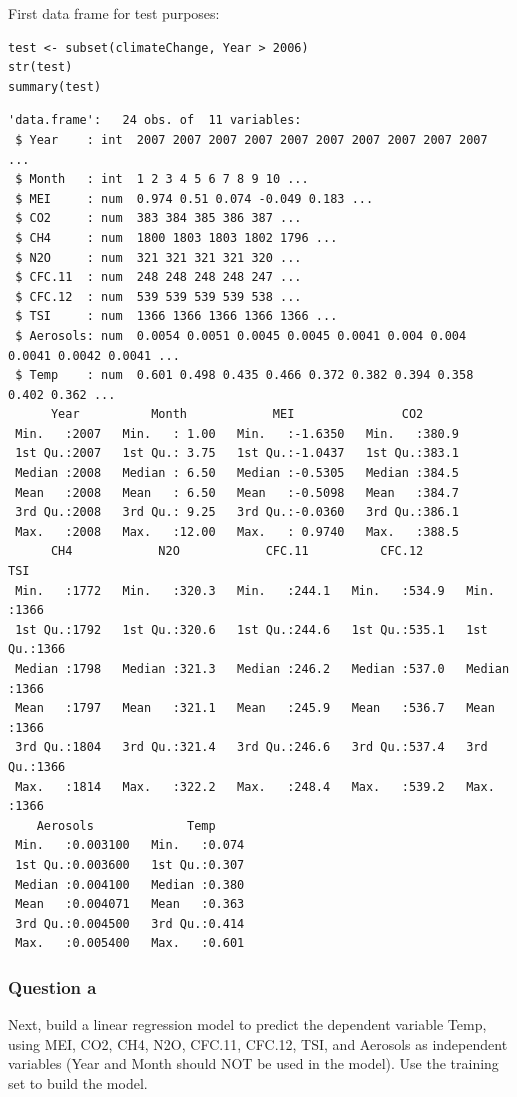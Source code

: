 \documentclass[letterpaper, 9pt, onecolumn, twoside, technote, final]{IEEEtran}
\begin{document}
First data frame for test purposes:

\begin{verbatim}
test <- subset(climateChange, Year > 2006)
str(test)
summary(test)
\end{verbatim}

\begin{verbatim}
'data.frame':	24 obs. of  11 variables:
 $ Year    : int  2007 2007 2007 2007 2007 2007 2007 2007 2007 2007 ...
 $ Month   : int  1 2 3 4 5 6 7 8 9 10 ...
 $ MEI     : num  0.974 0.51 0.074 -0.049 0.183 ...
 $ CO2     : num  383 384 385 386 387 ...
 $ CH4     : num  1800 1803 1803 1802 1796 ...
 $ N2O     : num  321 321 321 321 320 ...
 $ CFC.11  : num  248 248 248 248 247 ...
 $ CFC.12  : num  539 539 539 539 538 ...
 $ TSI     : num  1366 1366 1366 1366 1366 ...
 $ Aerosols: num  0.0054 0.0051 0.0045 0.0045 0.0041 0.004 0.004 0.0041 0.0042 0.0041 ...
 $ Temp    : num  0.601 0.498 0.435 0.466 0.372 0.382 0.394 0.358 0.402 0.362 ...
      Year          Month            MEI               CO2
 Min.   :2007   Min.   : 1.00   Min.   :-1.6350   Min.   :380.9
 1st Qu.:2007   1st Qu.: 3.75   1st Qu.:-1.0437   1st Qu.:383.1
 Median :2008   Median : 6.50   Median :-0.5305   Median :384.5
 Mean   :2008   Mean   : 6.50   Mean   :-0.5098   Mean   :384.7
 3rd Qu.:2008   3rd Qu.: 9.25   3rd Qu.:-0.0360   3rd Qu.:386.1
 Max.   :2008   Max.   :12.00   Max.   : 0.9740   Max.   :388.5
      CH4            N2O            CFC.11          CFC.12           TSI
 Min.   :1772   Min.   :320.3   Min.   :244.1   Min.   :534.9   Min.   :1366
 1st Qu.:1792   1st Qu.:320.6   1st Qu.:244.6   1st Qu.:535.1   1st Qu.:1366
 Median :1798   Median :321.3   Median :246.2   Median :537.0   Median :1366
 Mean   :1797   Mean   :321.1   Mean   :245.9   Mean   :536.7   Mean   :1366
 3rd Qu.:1804   3rd Qu.:321.4   3rd Qu.:246.6   3rd Qu.:537.4   3rd Qu.:1366
 Max.   :1814   Max.   :322.2   Max.   :248.4   Max.   :539.2   Max.   :1366
    Aerosols             Temp
 Min.   :0.003100   Min.   :0.074
 1st Qu.:0.003600   1st Qu.:0.307
 Median :0.004100   Median :0.380
 Mean   :0.004071   Mean   :0.363
 3rd Qu.:0.004500   3rd Qu.:0.414
 Max.   :0.005400   Max.   :0.601
\end{verbatim}

\subsubsection{Question a}
\label{sec-1-1-3}

Next, build a linear regression model to predict the dependent
variable Temp, using MEI, CO2, CH4, N2O, CFC.11, CFC.12, TSI, and
Aerosols as independent variables (Year and Month should NOT be used
in the model). Use the training set to build the model.
\end{document}
